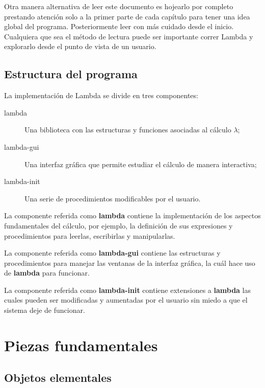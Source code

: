 \documentclass[letterpaper, twoside, openright, 11pt]{book}%
\newcommand{\titulo}{{\Tt{}Lambda\nwendquote}}
\begin{document}
Otra manera alternativa de leer este documento es hojearlo por completo prestando atención solo a la primer parte de cada capítulo para tener una idea global del programa. Posteriormente leer con más cuidado desde el inicio. Cualquiera que sea el método de lectura puede ser importante correr {\Tt{}Lambda\nwendquote} y explorarlo desde el punto de vista de un usuario.

\section{Estructura del programa}

La implementación de {\Tt{}Lambda\nwendquote} se divide en tres componentes:

\begin{description}
\item[lambda] Una biblioteca con las estructuras y funciones asociadas al cálculo $ \lambda $;
\item[lambda-gui] Una interfaz gráfica que permite estudiar el cálculo de manera interactiva;
\item[lambda-init] Una serie de procedimientos modificables por el usuario.
\end{description}

La componente referida como \textbf{lambda} contiene la implementación de los aspectos fundamentales del cálculo, por ejemplo, la definición de sus expresiones y procedimientos para leerlas, escribirlas y manipularlas.

La componente referida como \textbf{lambda-gui} contiene las estructuras y procedimientos para manejar las ventanas de la interfaz gráfica, la cuál hace uso de \textbf{lambda} para funcionar.

La componente referida como \textbf{lambda-init} contiene extensiones a \textbf{lambda} las cuales pueden ser modificadas y aumentadas por el usuario sin miedo a que el sistema deje de funcionar.

\chapter{Piezas fundamentales}
\markboth{
  \normalsize\hfill\textit{\titulo}\hfill
}{
  \normalsize\hfill\textit{\thechapter.\ \ Piezas fundamentales}\hfill
}
\label{ap2:piezas-fundamentales}

\section{Objetos elementales}
\end{document}

